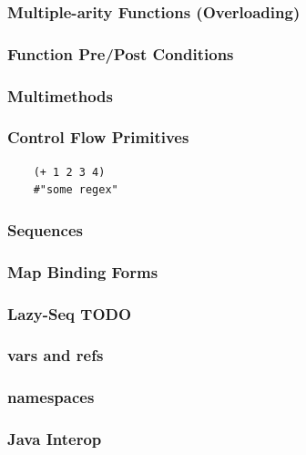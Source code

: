\documentclass{beamer}
\begin{document}
\begin{frame}
  \frametitle{Multiple-arity Functions (Overloading)}
\end{frame}

\begin{frame}
  \frametitle{Function Pre/Post Conditions}
\end{frame}

\begin{frame}
  \frametitle{Multimethods}
\end{frame}

\begin{frame}[fragile]
  \frametitle{Control Flow Primitives}
  \begin{verbatim}
    (+ 1 2 3 4)
    #"some regex"

  \end{verbatim}
\end{frame}

\begin{frame}
  \frametitle{Sequences}
\end{frame}

\begin{frame}
  \frametitle{Map Binding Forms}
\end{frame}

\begin{frame}
  \frametitle{Lazy-Seq TODO}
\end{frame}

\begin{frame}
  \frametitle{vars and refs}
\end{frame}

\begin{frame}
  \frametitle{namespaces}
\end{frame}

\begin{frame}
  \frametitle{Java Interop}
  
\end{frame}
\end{document}

